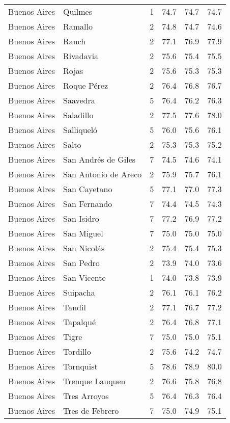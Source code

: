 \documentclass[12pt,spanish,]{article}
\begin{document}
\begin{landscape}
\begin{longtable}[t]{llrrrr}
\addlinespace
Buenos Aires & Quilmes & 1 & 74.7 & 74.7 & 74.7\\
Buenos Aires & Ramallo & 2 & 74.8 & 74.7 & 74.6\\
Buenos Aires & Rauch & 2 & 77.1 & 76.9 & 77.9\\
Buenos Aires & Rivadavia & 2 & 75.6 & 75.4 & 75.5\\
Buenos Aires & Rojas & 2 & 75.6 & 75.3 & 75.3\\
\addlinespace
Buenos Aires & Roque Pérez & 2 & 76.4 & 76.8 & 76.7\\
Buenos Aires & Saavedra & 5 & 76.4 & 76.2 & 76.3\\
Buenos Aires & Saladillo & 2 & 77.5 & 77.6 & 78.0\\
Buenos Aires & Salliqueló & 5 & 76.0 & 75.6 & 76.1\\
Buenos Aires & Salto & 2 & 75.3 & 75.3 & 75.2\\
\addlinespace
Buenos Aires & San Andrés de Giles & 7 & 74.5 & 74.6 & 74.1\\
Buenos Aires & San Antonio de Areco & 2 & 75.9 & 75.7 & 76.1\\
Buenos Aires & San Cayetano & 5 & 77.1 & 77.0 & 77.3\\
Buenos Aires & San Fernando & 7 & 74.4 & 74.5 & 74.3\\
Buenos Aires & San Isidro & 7 & 77.2 & 76.9 & 77.2\\
\addlinespace
Buenos Aires & San Miguel & 7 & 75.0 & 75.0 & 75.0\\
Buenos Aires & San Nicolás & 2 & 75.4 & 75.4 & 75.3\\
Buenos Aires & San Pedro & 2 & 73.9 & 74.0 & 73.6\\
Buenos Aires & San Vicente & 1 & 74.0 & 73.8 & 73.9\\
Buenos Aires & Suipacha & 2 & 76.1 & 76.1 & 76.2\\
\addlinespace
Buenos Aires & Tandil & 2 & 77.1 & 76.7 & 77.2\\
Buenos Aires & Tapalqué & 2 & 76.4 & 76.8 & 77.1\\
Buenos Aires & Tigre & 7 & 75.0 & 75.0 & 75.1\\
Buenos Aires & Tordillo & 2 & 75.6 & 74.2 & 74.7\\
Buenos Aires & Tornquist & 5 & 78.6 & 78.9 & 80.0\\
\addlinespace
Buenos Aires & Trenque Lauquen & 2 & 76.6 & 75.8 & 76.8\\
Buenos Aires & Tres Arroyos & 5 & 76.4 & 76.3 & 76.4\\
Buenos Aires & Tres de Febrero & 7 & 75.0 & 74.9 & 75.1\\

\end{longtable}
\end{landscape}
\end{document}
